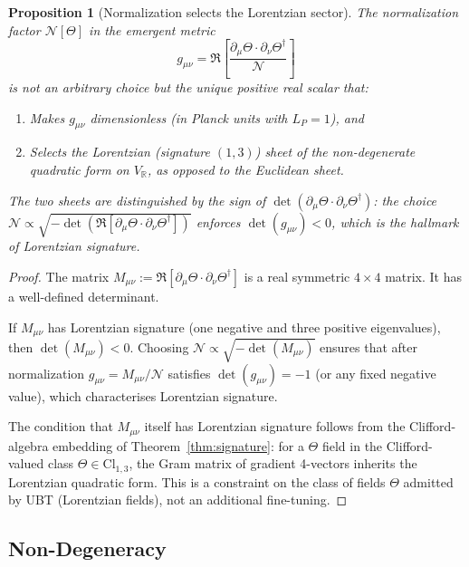 \documentclass[12pt]{article}
\newtheorem{proposition}[theorem]{Proposition}
\theoremstyle{definition}
\theoremstyle{remark}
\begin{document}
\begin{proposition}[Normalization selects the Lorentzian sector]
\label{prop:normalization}
The normalization factor $\mathcal{N}[\Theta]$ in the emergent metric
\begin{equation}
  g_{\mu\nu} = \Re\!\left[\frac{\partial_\mu\Theta\cdot\partial_\nu\Theta^\dagger}{\mathcal{N}}\right]
\end{equation}
is not an arbitrary choice but the unique positive real scalar that:
\begin{enumerate}
  \item Makes $g_{\mu\nu}$ dimensionless (in Planck units with $L_P=1$), and
  \item Selects the Lorentzian (signature $(1,3)$) sheet of the non-degenerate quadratic
        form on $V_{\mathbb{R}}$, as opposed to the Euclidean sheet.
\end{enumerate}
The two sheets are distinguished by the sign of $\det(\partial_\mu\Theta\cdot\partial_\nu\Theta^\dagger)$:
the choice $\mathcal{N} \propto \sqrt{-\det(\Re[\partial_\mu\Theta\cdot\partial_\nu\Theta^\dagger])}$
enforces $\det(g_{\mu\nu})<0$, which is the hallmark of Lorentzian signature.
\end{proposition}

\begin{proof}
The matrix $M_{\mu\nu} := \Re[\partial_\mu\Theta\cdot\partial_\nu\Theta^\dagger]$ is a
real symmetric $4\times 4$ matrix.  It has a well-defined determinant.

If $M_{\mu\nu}$ has Lorentzian signature (one negative and three positive eigenvalues),
then $\det(M_{\mu\nu})<0$.  Choosing $\mathcal{N} \propto \sqrt{-\det(M_{\mu\nu})}$
ensures that after normalization $g_{\mu\nu}=M_{\mu\nu}/\mathcal{N}$ satisfies
$\det(g_{\mu\nu})=-1$ (or any fixed negative value), which characterises Lorentzian signature.

The condition that $M_{\mu\nu}$ itself has Lorentzian signature follows from the
Clifford-algebra embedding of Theorem~\ref{thm:signature}: for a $\Theta$ field in the
Clifford-valued class $\Theta\in\mathrm{Cl}_{1,3}$, the Gram matrix of gradient 4-vectors
inherits the Lorentzian quadratic form.  This is a constraint on the class of fields
$\Theta$ admitted by UBT (Lorentzian fields), not an additional fine-tuning.
\end{proof}

\subsection{Non-Degeneracy}
\end{document}
